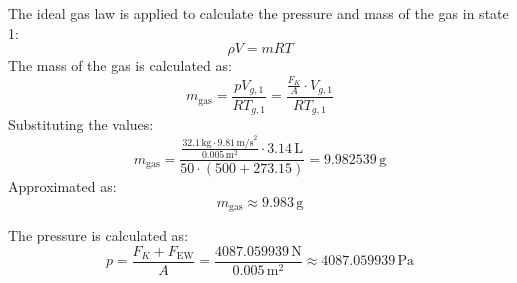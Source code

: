 The ideal gas law is applied to calculate the pressure and mass of the gas in state 1:  
\[
\rho V = mRT
\]  
The mass of the gas is calculated as:  
\[
m_{\text{gas}} = \frac{p V_{g,1}}{R T_{g,1}} = \frac{\frac{F_K}{A} \cdot V_{g,1}}{R T_{g,1}}
\]  
Substituting the values:  
\[
m_{\text{gas}} = \frac{\frac{32.1 \, \text{kg} \cdot 9.81 \, \text{m/s}^2}{0.005 \, \text{m}^2} \cdot 3.14 \, \text{L}}{50 \cdot (500 + 273.15)} = 9.982539 \, \text{g}
\]  
Approximated as:  
\[
m_{\text{gas}} \approx 9.983 \, \text{g}
\]  

The pressure is calculated as:  
\[
p = \frac{F_K + F_{\text{EW}}}{A} = \frac{4087.059939 \, \text{N}}{0.005 \, \text{m}^2} \approx 4087.059939 \, \text{Pa}
\]